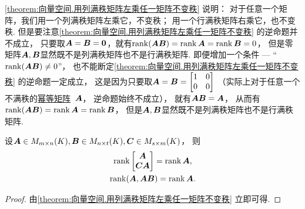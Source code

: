 \begin{remark}
\cref{theorem:向量空间.用列满秩矩阵左乘任一矩阵不变秩} 说明：
对于任意一个矩阵，我们用一个列满秩矩阵左乘它，不变秩；
用一个行满秩矩阵右乘它，也不变秩.
但是要注意\cref{theorem:向量空间.用列满秩矩阵左乘任一矩阵不变秩} 的逆命题并不成立，
只要取\(\boldsymbol{A} = \boldsymbol{B} = \boldsymbol0\)，就有\(\rank(\boldsymbol{A} \boldsymbol{B}) = \rank\boldsymbol{A} = \rank\boldsymbol{B} = 0\)，
但是零矩阵\(\boldsymbol{A},\boldsymbol{B}\)显然既不是列满秩矩阵也不是行满秩矩阵.
即便增加一个条件 --- “\(\rank(\boldsymbol{A} \boldsymbol{B})\neq0\)”，
也不能断定\cref{theorem:向量空间.用列满秩矩阵左乘任一矩阵不变秩} 的逆命题一定成立，
这是因为只要取\(\boldsymbol{A} = \boldsymbol{B}
= \begin{bmatrix}
	1 & 0 \\
	0 & 0
\end{bmatrix}\)
（实际上对于任意一个不满秩的\hyperref[definition:幂等矩阵.幂等矩阵的定义]{幂等矩阵}~\(\boldsymbol{A}\)，
逆命题始终不成立），
就有\(\boldsymbol{A} \boldsymbol{B} = \boldsymbol{A}\)，
从而有\(\rank(\boldsymbol{A} \boldsymbol{B}) = \rank\boldsymbol{A} = \rank\boldsymbol{B}\)，
但是\(\boldsymbol{A},\boldsymbol{B}\)显然既不是列满秩矩阵也不是行满秩矩阵.
\end{remark}
\begin{corollary}\label{theorem:西尔维斯特不等式.分块矩阵的秩的等式3}
设\(\boldsymbol{A} \in M_{m \times n}(K),
\boldsymbol{B} \in M_{n \times t}(K),
\boldsymbol{C} \in M_{s \times m}(K)\)，
则\begin{gather*}
	\rank\begin{bmatrix}
		\boldsymbol{A} \\
		\boldsymbol{C} \boldsymbol{A}
	\end{bmatrix}
	= \rank\boldsymbol{A}, \\
	\rank(\boldsymbol{A},\boldsymbol{A} \boldsymbol{B})
	= \rank\boldsymbol{A}.
\end{gather*}
\begin{proof}
由\cref{theorem:向量空间.用列满秩矩阵左乘任一矩阵不变秩} 立即可得.
\end{proof}
\end{corollary}
